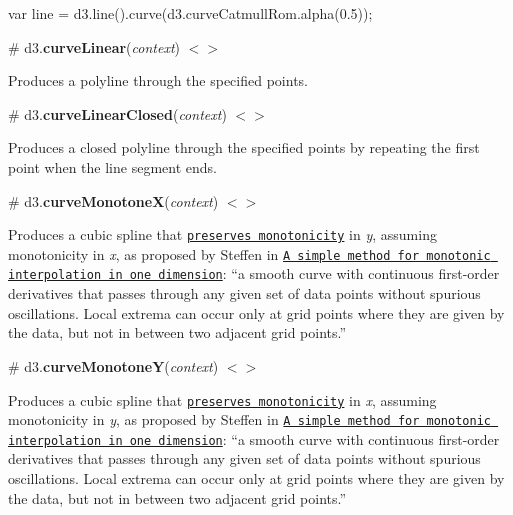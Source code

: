 \begin{DoxyCode}
var line = d3.line().curve(d3.curveCatmullRom.alpha(0.5));
\end{DoxyCode}


\label{_curveLinear}%
\# d3.{\bfseries curve\+Linear}({\itshape context}) \href{https://github.com/d3/d3-shape/blob/master/src/curve/linear.js}{\tt $<$$>$}



Produces a polyline through the specified points.

\label{_curveLinearClosed}%
\# d3.{\bfseries curve\+Linear\+Closed}({\itshape context}) \href{https://github.com/d3/d3-shape/blob/master/src/curve/linearClosed.js}{\tt $<$$>$}



Produces a closed polyline through the specified points by repeating the first point when the line segment ends.

\label{_curveMonotoneX}%
\# d3.{\bfseries curve\+MonotoneX}({\itshape context}) \href{https://github.com/d3/d3-shape/blob/master/src/curve/monotone.js#L98}{\tt $<$$>$}



Produces a cubic spline that \href{https://en.wikipedia.org/wiki/Monotone_cubic_interpolation}{\tt preserves monotonicity} in {\itshape y}, assuming monotonicity in {\itshape x}, as proposed by Steffen in \href{http://adsabs.harvard.edu/full/1990A%26A...239..443S}{\tt A simple method for monotonic interpolation in one dimension}\+: “a smooth curve with continuous first-\/order derivatives that passes through any given set of data points without spurious oscillations. Local extrema can occur only at grid points where they are given by the data, but not in between two adjacent grid points.\+”

\label{_curveMonotoneY}%
\# d3.{\bfseries curve\+MonotoneY}({\itshape context}) \href{https://github.com/d3/d3-shape/blob/master/src/curve/monotone.js#L102}{\tt $<$$>$}



Produces a cubic spline that \href{https://en.wikipedia.org/wiki/Monotone_cubic_interpolation}{\tt preserves monotonicity} in {\itshape x}, assuming monotonicity in {\itshape y}, as proposed by Steffen in \href{http://adsabs.harvard.edu/full/1990A%26A...239..443S}{\tt A simple method for monotonic interpolation in one dimension}\+: “a smooth curve with continuous first-\/order derivatives that passes through any given set of data points without spurious oscillations. Local extrema can occur only at grid points where they are given by the data, but not in between two adjacent grid points.\+”


